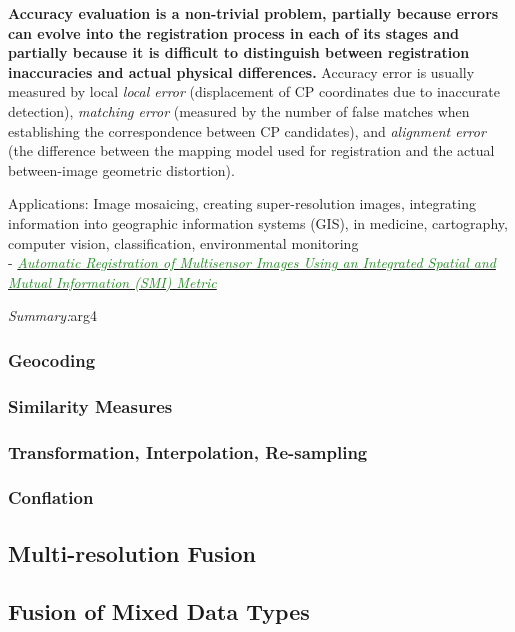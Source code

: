 \documentclass[]{article}
\newcommand{\paperentry}[4]{
            \hangindent=1cm
            \cite{#1} - \href{run:../References/#3}{\textcolor{ForestGreen}{\textit{#2}}}
            
            \noindent            
            \begin{minipage}[t]{0.1\linewidth}\hfill\end{minipage}
            \begin{minipage}[t]{0.8\linewidth}\textcolor{NavyBlue}{{\textit{Summary:}}}#4\end{minipage}
            \vspace{.25cm}
          }
\begin{document}
		\noindent
		\textbf{Accuracy evaluation is a non-trivial problem, partially because errors can evolve into the registration process in each of its stages and partially because it is difficult to distinguish between registration inaccuracies and actual physical differences.}  Accuracy error is usually measured by local \textit{local error} (displacement of CP coordinates due to inaccurate detection), \textit{matching error} (measured by the number of false matches when establishing the correspondence between CP candidates), and \textit{alignment error} (the difference between the mapping model used for registration and the actual between-image geometric distortion).
		
		\noindent
		Applications: Image mosaicing, creating super-resolution images, integrating information into geographic information systems (GIS), in medicine, cartography, computer vision, classification, environmental monitoring \\
		
		\paperentry{Liang2014ImageRegistrationMutualInformation}
		{Automatic Registration of Multisensor Images Using an Integrated Spatial and Mutual Information (SMI) Metric}
		{Fusion/Liang2014ImageRegistrationMutualInformation.pdf}
		{arg4}
		
	
		\subsubsection{Geocoding}
	
		\subsubsection{Similarity Measures}
	
		\subsubsection{Transformation, Interpolation, Re-sampling}
	
		\subsubsection{Conflation}
		
	\subsection{Multi-resolution Fusion}
	
	\subsection{Fusion of Mixed Data Types}
		
\end{document}
